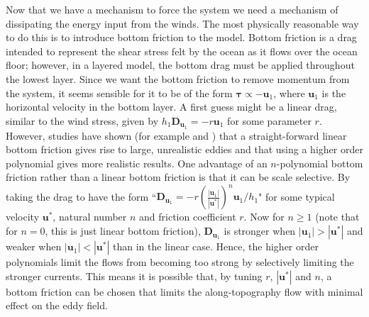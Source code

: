 \documentclass[12pt,a4paper]{report}
\begin{document}
  Now that we have a mechanism to force the system we need a 
  mechanism of dissipating the 
  energy input from the winds. The most physically reasonable way to do this is to
   introduce bottom friction to the model. Bottom friction is a drag intended to represent 
  the shear stress felt by the ocean as it flows over the ocean floor; however,
  in a layered model, the bottom drag must be applied throughout
  the lowest layer. Since we want the bottom friction to remove momentum
  from the system, it seems sensible for it to be of the form $\boldsymbol{\tau} \propto
  - \boldsymbol{u}_{1}$, where $\boldsymbol{u}_{1}$ is the horizontal velocity
  in the bottom layer. A first guess might be a linear drag, similar to the wind stress,
  given by  $h_{1}\boldsymbol{D}_{\boldsymbol{u}_{1}} = - r \boldsymbol{u}_{1}$ for
  some parameter $r$. However, studies have shown (for example \cite{grianik2004effects} and
  \cite{arbic2008quadratic})
  that a straight-forward linear
  bottom friction gives rise to large, unrealistic eddies and that using a higher order
  polynomial gives more realistic results.
  One advantage of an $n$-polynomial bottom  friction rather than 
  a linear bottom friction is that it can be scale selective. By taking the 
  drag to have the form ``$\boldsymbol{D}_{\boldsymbol{u}_{1}} = 
  - r \left( \frac{ \left|\boldsymbol{u}_{1}\right| }
  {\left|\boldsymbol{u}^{\ast}\right|}\right)^{n}
  \boldsymbol{u}_{1}/h_{1}$" for some typical velocity $\boldsymbol{u}^{\ast}$, 
  natural number $n$ and friction coefficient $r$. Now for $n \geq 1$ (note that for $n=0$, this is 
  just linear bottom friction), $\boldsymbol{D}_{\boldsymbol{u}_{1}}$
  is stronger when $\left|\boldsymbol{u}_{1}\right| > \left|\boldsymbol{u}^{\ast}\right|$
  and weaker when $\left|\boldsymbol{u}_{1}\right| < \left|\boldsymbol{u}^{\ast}\right|$
  than in the linear case. Hence, the higher order polynomials limit the flows from 
  becoming too strong by selectively limiting the stronger currents.
  This means it is possible that, by tuning $r$, $\left|\boldsymbol{u}^{\ast}\right|$ and 
  $n$, a bottom friction can be chosen that limits the along-topography flow with
  minimal effect on the eddy field. 
  
\end{document}
